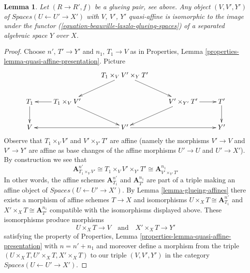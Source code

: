 \documentclass{stacks-project}
\theoremstyle{plain}
\newtheorem{lemma}[subsection]{Lemma}
\theoremstyle{definition}
\theoremstyle{remark}
\numberwithin{equation}{subsection}
\begin{document}
\begin{lemma}
\label{lemma-glueing-quasi-affines}
Let $(R \to R', f)$ be a glueing pair, see above. Any object
$(V, V', Y')$ of $\textit{Spaces}(U \leftarrow U' \to X')$
with $V$, $V'$, $Y'$ quasi-affine is isomorphic to
the image under the functor (\ref{equation-beauville-laszlo-glueing-spaces})
of a separated algebraic space $Y$ over $X$.
\end{lemma}

\begin{proof}
Choose $n'$, $T' \to Y'$ and $n_1$, $T_1 \to V$ as in
Properties, Lemma \ref{properties-lemma-quasi-affine-presentation}.
Picture
$$
\xymatrix{
& &
T_1 \times_V V' \times_Y T' \ar[ld] \ar[rd] \\
T_1 \ar[d] &
T_1 \times_V V' \ar[l] \ar[dr] & &
V' \times_{Y'} T' \ar[r] \ar[dl] &
T' \ar[d] \\
V & &
V' \ar[rr] \ar[ll] & &
Y'
}
$$
Observe that $T_1 \times_V V'$ and $V' \times_{Y'} T'$
are affine (namely the morphisms $V' \to V$ and $V' \to Y'$
are affine as base changes of the affine morphisms $U' \to U$
and $U' \to X'$). By construction we see that
$$
\mathbf{A}^{n'}_{T_1 \times_V V'} \cong
T_1 \times_V V' \times_{Y'} T' \cong
\mathbf{A}^{n_1}_{V' \times_{Y'} T'}
$$
In other words, the affine schemes $\mathbf{A}^{n'}_{T_1}$
and $\mathbf{A}^{n_1}_{T'}$ are part of a triple making an affine object of
$\textit{Spaces}(U \leftarrow U' \to X')$.
By Lemma \ref{lemma-glueing-affines}
there exists a morphism of affine schemes $T \to X$
and isomorphisms $U \times_X T \cong \mathbf{A}^{n'}_{T_1}$
and $X' \times_X T \cong \mathbf{A}^{n_1}_{T'}$ compatible
with the isomorphisms displayed above.
These isomorphisms produce morphisms
$$
U \times_X T \longrightarrow V
\quad\text{and}\quad
X' \times_X T \longrightarrow Y'
$$
satisfying the property of
Properties, Lemma \ref{properties-lemma-quasi-affine-presentation}
with $n = n' + n_1$ and moreover define a morphism from the triple
$(U \times_X T, U' \times_X T, X' \times_X T)$ to
our triple $(V, V', Y')$ in the category
$\textit{Spaces}(U \leftarrow U' \to X')$.


\end{proof}
\end{document}
